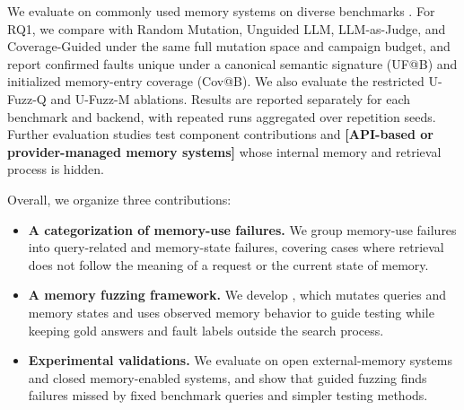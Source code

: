 We evaluate \system on commonly used memory systems \citep{} on diverse benchmarks \citep{}. For RQ1, we compare \system with Random Mutation, Unguided LLM, LLM-as-Judge, and Coverage-Guided under the same full mutation space and campaign budget, and report confirmed faults unique under a canonical semantic signature (UF@B) and initialized memory-entry coverage (Cov@B). We also evaluate the restricted U-Fuzz-Q and U-Fuzz-M ablations. Results are reported separately for each benchmark and backend, with repeated runs aggregated over repetition seeds. Further evaluation studies test component contributions and \textbf{[API-based or provider-managed memory systems]} whose internal memory and retrieval process is hidden.

Overall, we organize three contributions:
\begin{itemize}
    \item \textbf{A categorization of memory-use failures.} We group memory-use failures into query-related and memory-state failures, covering cases where retrieval does not follow the meaning of a request or the current state of memory.
    \item \textbf{A memory fuzzing framework.} We develop \system, which mutates queries and memory states and uses observed memory behavior to guide testing while keeping gold answers and fault labels outside the search process.
    
    \item \textbf{Experimental validations.} We evaluate \system on open external-memory systems and closed memory-enabled systems, and show that guided fuzzing finds failures missed by fixed benchmark queries and simpler testing methods.
\end{itemize}
